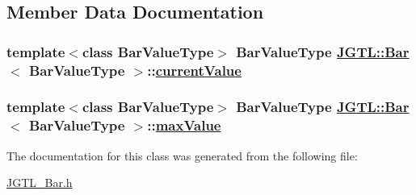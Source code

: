\subsection{Member Data Documentation}
\hypertarget{class_j_g_t_l_1_1_bar_dd6c45f5cbd5b7da6f56a990013c1449}{
\subsubsection[currentValue]{\setlength{\rightskip}{0pt plus 5cm}template$<$class Bar\-Value\-Type$>$ Bar\-Value\-Type \hyperlink{class_j_g_t_l_1_1_bar}{JGTL::Bar}$<$ Bar\-Value\-Type $>$::\hyperlink{class_j_g_t_l_1_1_bar_dd6c45f5cbd5b7da6f56a990013c1449}{current\-Value}}}
\label{class_j_g_t_l_1_1_bar_dd6c45f5cbd5b7da6f56a990013c1449}


\hypertarget{class_j_g_t_l_1_1_bar_e2d5d3214a0fe6036839c1ec3d8e4e0b}{
\subsubsection[maxValue]{\setlength{\rightskip}{0pt plus 5cm}template$<$class Bar\-Value\-Type$>$ Bar\-Value\-Type \hyperlink{class_j_g_t_l_1_1_bar}{JGTL::Bar}$<$ Bar\-Value\-Type $>$::\hyperlink{class_j_g_t_l_1_1_bar_e2d5d3214a0fe6036839c1ec3d8e4e0b}{max\-Value}}}
\label{class_j_g_t_l_1_1_bar_e2d5d3214a0fe6036839c1ec3d8e4e0b}




The documentation for this class was generated from the following file:\begin{CompactItemize}
\item 
\hyperlink{_j_g_t_l___bar_8h}{JGTL\_\-Bar.h}\end{CompactItemize}

